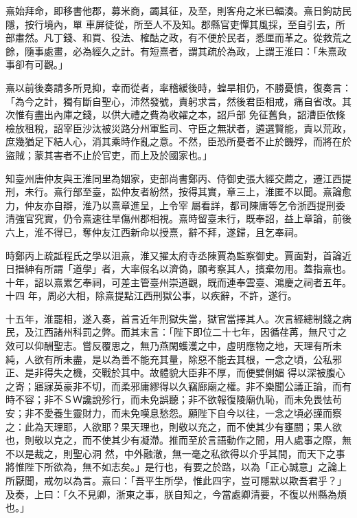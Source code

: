 \begin{pinyinscope}
 熹始拜命，即移書他郡，募米商，蠲其征，及至，則客舟之米已輻湊。熹日鉤訪民隱，按行境內，單
 車屏徒從，所至人不及知。郡縣官吏憚其風採，至自引去，所部肅然。凡丁錢、和買、役法、榷酤之政，有不便於民者，悉厘而革之。從救荒之餘，隨事處畫，必為經久之計。有短熹者，謂其疏於為政，上謂王淮曰：「朱熹政事卻有可觀。」



 熹以前後奏請多所見抑，幸而從者，率稽緩後時，蝗旱相仍，不勝憂憤，復奏言：「為今之計，獨有斷自聖心，沛然發號，責躬求言，然後君臣相戒，痛自省改。其次惟有盡出內庫之錢，以供大禮之費為收糴之本，詔戶部
 免征舊負，詔漕臣依條檢放租稅，詔宰臣沙汰被災路分州軍監司、守臣之無狀者，遴選賢能，責以荒政，庶幾猶足下結人心，消其乘時作亂之意。不然，臣恐所憂者不止於饑殍，而將在於盜賊；蒙其害者不止於官吏，而上及於國家也。」



 知臺州唐仲友與王淮同里為姻家，吏部尚書鄭丙、侍御史張大經交薦之，遷江西提刑，未行。熹行部至臺，訟仲友者紛然，按得其實，章三上，淮匿不以聞。熹論愈力，仲友亦自辯，淮乃以熹章進呈，上令宰
 屬看詳，都司陳庸等乞令浙西提刑委清強官究實，仍令熹速往旱傷州郡相視。熹時留臺未行，既奉詔，益上章論，前後六上，淮不得已，奪仲友江西新命以授熹，辭不拜，遂歸，且乞奉祠。



 時鄭丙上疏詆程氏之學以沮熹，淮又擢太府寺丞陳賈為監察御史。賈面對，首論近日搢紳有所謂「道學」者，大率假名以濟偽，願考察其人，擯棄勿用。蓋指熹也。十年，詔以熹累乞奉祠，可差主管臺州崇道觀，既而連奉雲臺、鴻慶之祠者五年。十四
 年，周必大相，除熹提點江西刑獄公事，以疾辭，不許，遂行。



 十五年，淮罷相，遂入奏，首言近年刑獄失當，獄官當擇其人。次言經總制錢之病民，及江西諸州科罰之弊。而其末言：「陛下即位二十七年，因循荏苒，無尺寸之效可以仰酬聖志。嘗反覆思之，無乃燕閑蠖濩之中，虛明應物之地，天理有所未純，人欲有所未盡，是以為善不能充其量，除惡不能去其根，一念之頃，公私邪正、是非得失之機，交戰於其中。故體貌大臣非不厚，而便嬖側媚
 得以深被腹心之寄；寤寐英豪非不切，而柔邪庸繆得以久竊廊廟之權。非不樂聞公議正論，而有時不容；非不ＳＷ讒說殄行，而未免誤聽；非不欲報復陵廟仇恥，而未免畏怯茍安；非不愛養生靈財力，而未免嘆息愁怨。願陛下自今以往，一念之頃必謹而察之：此為天理耶，人欲耶？果天理也，則敬以充之，而不使其少有壅閼；果人欲也，則敬以克之，而不使其少有凝滯。推而至於言語動作之間，用人處事之際，無不以是裁之，則聖心洞
 然，中外融澈，無一毫之私欲得以介乎其間，而天下之事將惟陛下所欲為，無不如志矣。」是行也，有要之於路，以為「正心誠意」之論上所厭聞，戒勿以為言。熹曰：「吾平生所學，惟此四字，豈可隱默以欺吾君乎？」及奏，上曰：「久不見卿，浙東之事，朕自知之，今當處卿清要，不復以州縣為煩也。」




\end{pinyinscope}
